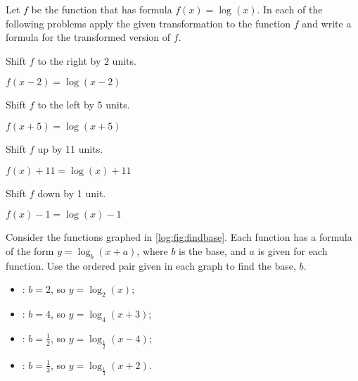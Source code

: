 \begin{exercises}
\begin{problem}
Let $f$ be the function that has formula $f(x)=\log(x)$. In each of the following 
problems apply the given transformation to the function $f$ and 
write a formula for the transformed version of $f$.
\begin{multicols}{2}
	\begin{subproblem}
		Shift $f$ to the right by $2$ units. 
		\begin{shortsolution}
			$f(x-2)=\log(x-2)$
		\end{shortsolution}
	\end{subproblem}
	\begin{subproblem}
		Shift $f$ to the left by $5$ units. 
		\begin{shortsolution}
			$f(x+5)=\log(x+5)$
		\end{shortsolution}
	\end{subproblem}
	\begin{subproblem}
		Shift $f$ up by 11 units. 
		\begin{shortsolution}
			$f(x)+11=\log(x)+11$
		\end{shortsolution}
	\end{subproblem}
	\begin{subproblem}
		Shift $f$ down by 1 unit. 
		\begin{shortsolution}
			$f(x)-1=\log(x)-1$
		\end{shortsolution}
	\end{subproblem}
\end{multicols}
\end{problem}

\begin{problem}\label{log:prob:findbase}
Consider the functions graphed in \cref{log:fig:findbase}. Each function 
has a formula of the form $y=\log_b(x+a)$, where $b$ is the base, and 
$a$ is given for each function. Use the ordered pair given in each graph to find the base, $b$.
\begin{shortsolution}
	\begin{itemize}
		\item {}: $b=2$, so $y=\log_2(x)$;
		\item {}: $b=4$, so $y=\log_4(x+3)$;
		\item {}: $b=\frac{1}{2}$, so $y=\log_{\frac{1}{2}}(x-4)$;
		\item {}: $b=\frac{1}{3}$, so $y=\log_{\frac{1}{3}}(x+2)$.
	\end{itemize}
\end{shortsolution}


\end{problem}
\end{exercises}
